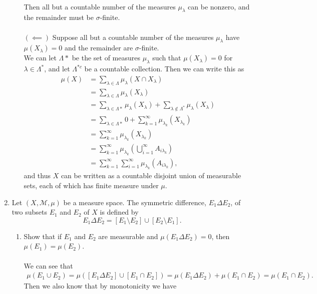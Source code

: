 \begin{enumerate}
\begin{enumerate}[label=(\roman*),align=left]
		\\Then all but a countable number of the measures $\mu_\lambda$ can be nonzero, and the remainder must be $\sigma$-finite.\\
		\\$(\impliedby)$ Suppose all but a countable number of the measures $\mu_\lambda$ have $\mu(X_\lambda)=0$ and the remainder are $\sigma$-finite.\\
		We can let $\Lambda*$ be the set of measures $\mu_\lambda$ such that $\mu(X_\lambda)=0$ for $\lambda\in\Lambda^*$, and let $\Lambda^{*c}$ be a countable collection.
		Then we can write this as
		\begin{align*}
			\mu(X)&=\sum_{\lambda\in\Lambda} \mu_\lambda(X\cap X_\lambda)\\
			&=\sum_{\lambda\in\Lambda} \mu_\lambda(X_\lambda)\\		
			&=\sum_{\lambda\in\Lambda*} \mu_\lambda(X_\lambda)+\sum_{\lambda\notin\Lambda^*} \mu_\lambda(X_\lambda)\\	
			&=\sum_{\lambda\in\Lambda*} 0+\sum_{k=1}^\infty \mu_{\lambda_{k}}(X_{\lambda_{k}})\\
			&=\sum_{k=1}^\infty \mu_{\lambda_{k}}(X_{\lambda_{k}})\\
			&=\sum_{k=1}^\infty \mu_{\lambda_{k}}(\bigcup_{i=1}^\infty A_{i\lambda_{k}})\\
			&=\sum_{k=1}^\infty \sum_{i=1}^\infty \mu_{\lambda_{k}}( A_{i\lambda_{k}}),
		\end{align*}
		and thus $X$ can be written as a countable disjoint union of measurable sets, each of which has finite measure under $\mu$.
	\end{enumerate}
	\item Let $(X,\mathcal{M},\mu)$ be a measure space. The symmetric difference, $E_1\Delta E_2$, of two subsets $E_1$ and $E_2$ of $X$ is defined by
	\[
		E_1\Delta E_2=[E_1\setminus E_2]\cup[E_2\setminus E_1].
	\]
	\begin{enumerate}[label=(\roman*),align=left]   
		\item Show that if $E_1$ and $E_2$ are measurable and $\mu(E_1\Delta E_2)=0$, then $\mu(E_1)=\mu(E_2)$.\\
		\\We can see that
		\begin{align*}
			\mu(E_1\cup E_2)=\mu([E_1\Delta E_2]\cup[E_1\cap E_2])=\mu(E_1\Delta E_2)+\mu(E_1\cap E_2)=\mu(E_1\cap E_2).
		\end{align*}
		Then we also know that by monotonicity we have
		\begin{align*}

\end{align*}
\end{enumerate}
\end{enumerate}
